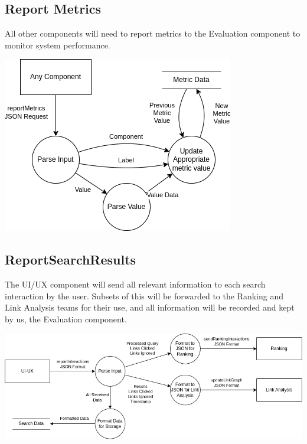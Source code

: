 \subsection*{Report Metrics}

All other components will need to report metrics to the Evaluation component to monitor system performance.

\begin{center}
  \includegraphics[scale=0.7]{DFDs/LowLevelDFDs-ReportMetric.drawio.png}
\end{center}

\subsection*{ReportSearchResults}

The UI/UX component will send all relevant information to each search interaction by the user. Subsets of this will be forwarded to the Ranking and Link Analysis teams for their use, and all information will be recorded and kept by us, the Evaluation component.

\begin{center}
  \includegraphics[scale=0.55]{DFDs/LowLevelDFDs-ReportSearchResults.drawio.png}
\end{center}